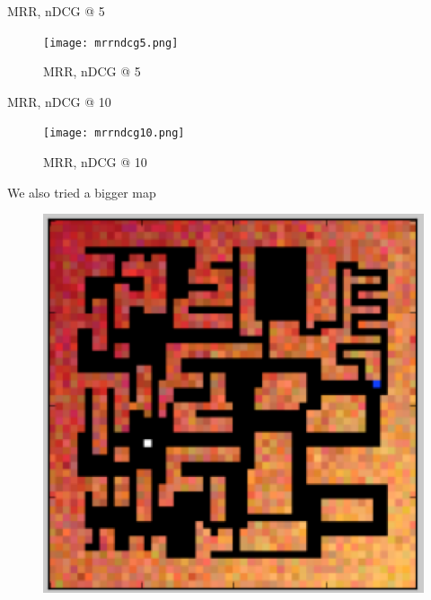 \documentclass{beamer}
\begin{document}
\begin{frame}{MRR, nDCG @ 5}
\begin{figure}
        \texttt{[image: mrrndcg5.png]}
        \caption{MRR, nDCG @ 5}
    \label{fig1}
\end{figure}
\end{frame}

\begin{frame}{MRR, nDCG @ 10}
\begin{figure}
        \texttt{[image: mrrndcg10.png]}
        \caption{MRR, nDCG @ 10}
    \label{fig1}
\end{figure}
\end{frame}
\fi
\begin{frame}
We also tried a bigger map
\begin{figure}
        \includegraphics[width=0.45\linewidth]{bigmap.png}
    \label{fig2}
\end{figure}
\end{frame}
\end{document}
